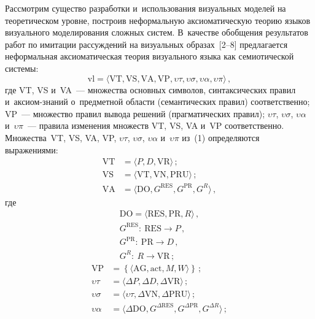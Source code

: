 \begin{multicols}{2}
  Рассмотрим существо разработки и~использования визуальных моделей на 
теоретическом уровне, построив неформальную аксиоматическую тео\-рию 
языков визуального моделирования сложных сис\-тем. В~качестве обобщения 
результатов работ по имитации рассуждений на визуальных образах~[2--8] 
предлагается неформальная аксиоматическая тео\-рия визуального языка как 
семиотической системы:
  \begin{equation}
  \mathrm{vl}=\langle \mathrm{VT}, \mathrm{VS}, \mathrm{VA}, 
  \mathrm{VP}, \upsilon\tau, \upsilon\sigma, \upsilon\alpha, 
\upsilon\pi\rangle\,,
  \label{e1-ls}
  \end{equation}
где VT, VS и~VA~--- множества основных символов, синтаксических 
правил и~ак\-си\-ом-зна\-ний о~предметной области (семантических правил) 
соответственно; VP~--- множество правил вывода решений (прагматических 
правил); $\upsilon\tau$, $\upsilon\sigma$, $\upsilon\alpha$ и~$\upsilon\pi$~--- 
правила изменения множеств VT, VS, VA и~VP соответственно. 
Множества~VT, VS, VA, VP, $\upsilon\tau$, $\upsilon\sigma$, 
$\upsilon\alpha$ и~$\upsilon\pi$  из~(1) определяются выражениями:
\begin{align}
\mathrm{VT}&=\langle P,D, \mathrm{VR}\rangle\,;\label{e2-ls}\\
\mathrm{VS} &= \langle \mathrm{VT}, \mathrm{VN}, \mathrm{PRU}\rangle\,;\label{e3-ls}\\
\mathrm{VA} &= \langle \mathrm{DO}, G^{\mathrm{RES}}, G^{\mathrm{PR}}, G^R\rangle\,,\label{e4-ls}
   \end{align}
где
   \begin{gather*}
   \mathrm{DO} = \langle \mathrm{RES}, \mathrm{PR}, R\rangle\,,\\
   G^{\mathrm{RES}}:\ \mathrm{RES}\to P\,,\\ 
   G^{\mathrm{PR}}:\ \mathrm{PR}\to D\,,\\ 
   G^R:\ R\to \mathrm{VR}\,;
   \end{gather*}
   \begin{align}
   \mathrm{VP}&=\left\{\langle \mathrm{AG}, \mathrm{act}, M, W\rangle\right\}\,;\label{e6-ls}\\
   \upsilon\tau &= \langle \Delta P, \Delta D, \Delta \mathrm{VR}\rangle\,;\label{e7-ls}\\
   \upsilon\sigma &= \langle \upsilon\tau, \Delta \mathrm{VN}, \Delta \mathrm{PRU}\rangle\,;\label{e8-ls}\\
   \upsilon\alpha &= \langle \Delta \mathrm{DO}, G^{\Delta \mathrm{RES}}, 
   G^{\Delta \mathrm{PR}}, G^{\Delta R}\rangle\,; 

\end{align}
\end{multicols}

